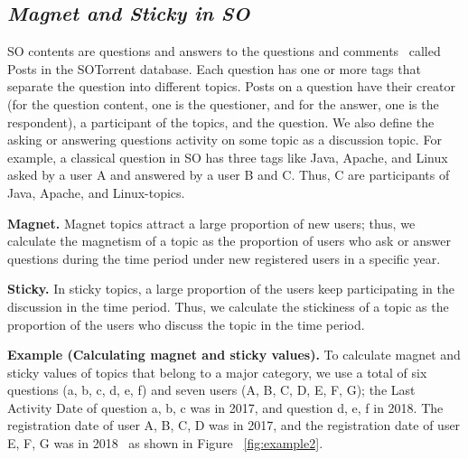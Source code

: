 \documentclass[english,preprint,JIP,technote]{ipsj}
\begin{document}
\subsection*{\textit{\textbf{Magnet and Sticky in SO}}}

SO contents are questions and answers to the questions and comments~\cite{liu2018mining} called Posts in the  SOTorrent\cite{baltes2018sotorrent} database. Each question has one or more tags that separate the question into different topics. Posts on a question have their creator (for the question content, one is the questioner, and for the answer, one is the respondent), a participant of the topics, and the question. We also define the asking or answering questions activity on some topic as a discussion topic. For example, a classical question in SO has three tags like Java, Apache, and Linux asked by a user A and answered by a user B and C. Thus, C are participants of Java, Apache, and Linux-topics.

\noindent
\textbf{Magnet.} Magnet topics attract a large proportion of new users; thus, we calculate the magnetism of a topic as the proportion of users who ask or answer questions during the time period under new registered users in a specific year.

\noindent
\textbf{Sticky.} In sticky topics, a large proportion of the users keep participating in the discussion in the time period. Thus, we calculate the stickiness of a topic as the proportion of the users who discuss the topic in the time period.

\noindent
\textbf{Example (Calculating magnet and sticky values).}
To calculate magnet and sticky values of topics that belong to a major category, we use a total of six questions (a, b, c, d, e, f) and seven users (A, B, C, D, E, F, G); the Last Activity Date of question a, b, c was in 2017, and question d, e, f in 2018. The registration date of user A, B, C, D was in 2017, and the registration date of user E, F, G was in 2018~\cite{yamashita2016magnet}  as shown in Figure ~\ref{fig:example2}.
\end{document}
